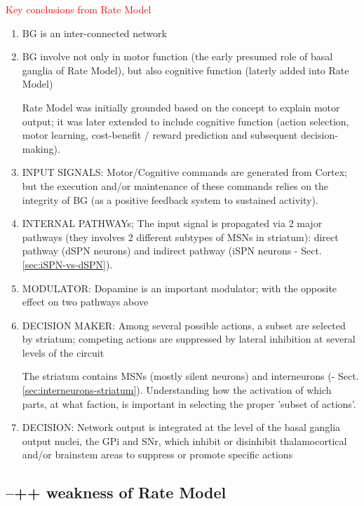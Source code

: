 \textcolor{red}{Key conclusions from Rate Model}
\begin{enumerate}
  \item BG is an inter-connected network
  
  \item BG involve not only in motor function (the early presumed role of basal
  ganglia of Rate Model), but also cognitive function (laterly added into Rate
  Model)

Rate Model was initially grounded based on the concept to explain motor output;
it was later extended to include cognitive function (action selection, motor
learning, cost-benefit / reward prediction and subsequent decision-making).
  
  \item INPUT SIGNALS: Motor/Cognitive commands are generated from Cortex; but
  the execution and/or maintenance of these commands relies on the integrity of
  BG (as a positive feedback system to sustained activity).
  
  \item INTERNAL PATHWAYs; The input signal is propagated via 2 major pathways
  (they involves 2 different subtypes of MSNs in striatum):
  direct pathway (dSPN neurons) and indirect pathway (iSPN neurons -
  Sect.\ref{sec:iSPN-vs-dSPN}).
  
  \item MODULATOR: Dopamine is an important modulator; with the opposite effect
  on two pathways above 
  
  \item DECISION MAKER: Among several possible actions, a subset are selected by
  striatum; competing actions are suppressed by lateral inhibition at several
  levels of the circuit 

The striatum contains MSNs (mostly silent neurons) and interneurons (-
Sect.\ref{sec:interneurons-striatum}). Understanding how the activation of which
parts, at what faction, is important in selecting the proper 'subset of
actions'.


  \item DECISION: Network output is integrated at the level of the basal ganglia
  output nuclei, the GPi and SNr, which inhibit or disinhibit thalamocortical
  and/or brainstem areas to suppress or promote specific actions 
  
\end{enumerate}



\subsection{--++ weakness of Rate Model}

